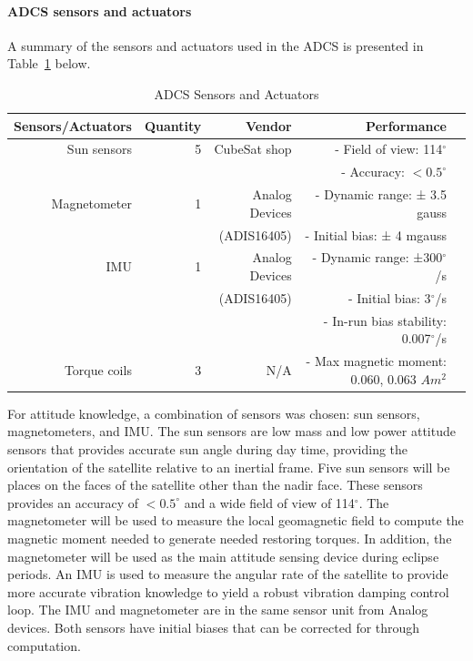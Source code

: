 \documentclass[12pt]{article}
\begin{document}
				\paragraph{ADCS sensors and actuators}
				A summary of the sensors and actuators used in the ADCS is presented in Table~\ref{tab:ADCS_sensors} below. 
\begin{table}[htbp]
  \centering
  \caption{ADCS Sensors and Actuators}
    \begin{tabular}{|r|r|r|r|r|}
    \hline
    Sensors/Actuators & Quantity & Vendor & Performance  &\bigstrut\\
    \hline
    Sun sensors & 5     & CubeSat shop & \multicolumn{1}{r}{- Field of view: 114$^\circ$} &  \bigstrut[t]\\
          &       &       & \multicolumn{1}{r}{- Accuracy: $< 0.5^\circ$} &  \bigstrut[b]\\
    \hline
    Magnetometer & 1     & Analog Devices  & \multicolumn{1}{r}{- Dynamic range: ± 3.5 gauss} &  \bigstrut[t]\\
          &       & (ADIS16405) & \multicolumn{1}{r}{- Initial bias: ± 4 mgauss} &  \bigstrut[b]\\
    \hline
    IMU   & 1     & Analog Devices  & \multicolumn{1}{r}{- Dynamic range: ±300$^\circ$/s} &  \bigstrut[t]\\
          &       & (ADIS16405) & \multicolumn{1}{r}{- Initial bias: 3$^\circ$/s} &  \\
          &       &       & \multicolumn{1}{r}{- In-run bias stability: 0.007$^\circ$/s} &  \bigstrut[b]\\
    \hline
    Torque coils & 3     & N/A   & \multicolumn{1}{r}{- Max magnetic moment: 0.060, 0.063 $Am^2$} &  \bigstrut\\
    \hline
    \end{tabular}%
  \label{tab:ADCS_sensors}%
\end{table}%

			For attitude knowledge, a combination of sensors was chosen: sun sensors, magnetometers, and IMU.  The sun sensors are low mass and low power attitude sensors that provides accurate sun angle during day time, providing the orientation of the satellite relative to an inertial frame. Five sun sensors will be places on the faces of the satellite other than the nadir face. These sensors provides an accuracy of $< 0.5^\circ$ and a wide field of view of 114$^\circ$. The magnetometer will be used to measure the local geomagnetic field to compute the magnetic moment needed to generate needed restoring torques. In addition, the magnetometer will be used as the main attitude sensing device during eclipse periods. An IMU is used to measure the angular rate of the satellite to provide more accurate vibration knowledge to yield a robust vibration damping control loop. The IMU and magnetometer are in the same sensor unit from Analog devices. Both sensors have initial biases that can be corrected for through computation. 
\end{document}
